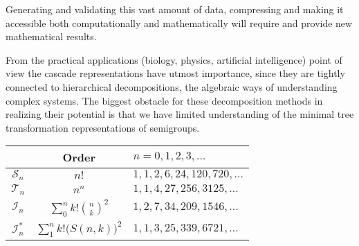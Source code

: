 \documentclass{amsart}
\newcommand{\T}{\mathcal T}
\newcommand{\I}{\mathcal I}
\newcommand{\cS}{\mathcal S}
\begin{document}
Generating  and validating this vast amount of data, compressing and making it accessible both computationally and mathematically  will require and provide new mathematical results.    

From the practical applications (biology, physics, artificial intelligence) point of view the cascade representations have utmost importance, since they are tightly connected to hierarchical decompositions, the algebraic ways of understanding complex systems. The biggest obstacle for these decomposition methods in realizing their potential is that we have limited understanding of the minimal tree transformation representations of semigroups. 


\begin{tabular}{|c|c|l|}
\hline
 & Order & $n=0,1,2,3,\ldots$\\ 
\hline 
$\cS_n$& $n!$ & $1, 1, 2, 6, 24, 120, 720,\ldots$\\
\hline 
$\T_n$& $n^n$ & $1,1,4,27,256,3125,\ldots$\\
\hline
$\I_n$&$\sum_0^n k!{n\choose k}^2$ &$1, 2, 7, 34, 209, 1546,\ldots$\\
\hline
$\I_n^*$& $\sum_1^n k!\big(S(n, k)\big)^2$&$1, 1, 3, 25, 339, 6721,\ldots$\\
\hline
\end{tabular}
\end{document}
